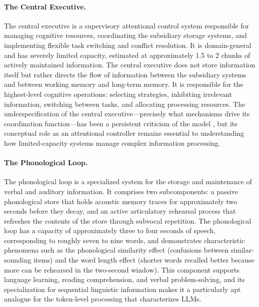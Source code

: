 \paragraph{The Central Executive.} The central executive is a supervisory attentional control system responsible for managing cognitive resources, coordinating the subsidiary storage systems, and implementing flexible task switching and conflict resolution. It is domain-general and has severely limited capacity, estimated at approximately 1.5 to 2 chunks of actively maintained information. The central executive does not store information itself but rather directs the flow of information between the subsidiary systems and between working memory and long-term memory. It is responsible for the highest-level cognitive operations: selecting strategies, inhibiting irrelevant information, switching between tasks, and allocating processing resources. The underspecification of the central executive---precisely what mechanisms drive its coordination function---has been a persistent criticism of the model \citep{baddeley2003working}, but its conceptual role as an attentional controller remains essential to understanding how limited-capacity systems manage complex information processing.

\paragraph{The Phonological Loop.} The phonological loop is a specialized system for the storage and maintenance of verbal and auditory information. It comprises two subcomponents: a passive phonological store that holds acoustic memory traces for approximately two seconds before they decay, and an active articulatory rehearsal process that refreshes the contents of the store through subvocal repetition. The phonological loop has a capacity of approximately three to four seconds of speech, corresponding to roughly seven to nine words, and demonstrates characteristic phenomena such as the phonological similarity effect (confusions between similar-sounding items) and the word length effect (shorter words recalled better because more can be rehearsed in the two-second window). This component supports language learning, reading comprehension, and verbal problem-solving, and its specialization for sequential linguistic information makes it a particularly apt analogue for the token-level processing that characterizes LLMs.

